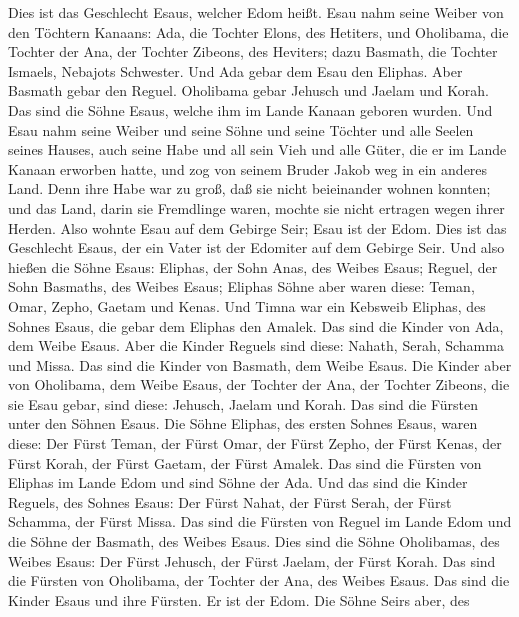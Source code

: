  Dies ist das Geschlecht Esaus, welcher Edom heißt.
 Esau nahm seine Weiber von den Töchtern Kanaans: Ada, die
Tochter Elons, des Hetiters, und Oholibama, die Tochter der Ana, der
Tochter Zibeons, des Heviters;  dazu Basmath, die Tochter
Ismaels, Nebajots Schwester.  Und Ada gebar dem Esau den
Eliphas. Aber Basmath gebar den Reguel.  Oholibama gebar
Jehusch und Jaelam und Korah. Das sind die Söhne Esaus, welche ihm im
Lande Kanaan geboren wurden.  Und Esau nahm seine Weiber
und seine Söhne und seine Töchter und alle Seelen seines Hauses, auch
seine Habe und all sein Vieh und alle Güter, die er im Lande Kanaan
erworben hatte, und zog von seinem Bruder Jakob weg in ein anderes Land.
 Denn ihre Habe war zu groß, daß sie nicht beieinander
wohnen konnten; und das Land, darin sie Fremdlinge waren, mochte sie
nicht ertragen wegen ihrer Herden.  Also wohnte Esau auf
dem Gebirge Seir; Esau ist der Edom.  Dies ist das
Geschlecht Esaus, der ein Vater ist der Edomiter auf dem Gebirge Seir.
 Und also hießen die Söhne Esaus: Eliphas, der Sohn Anas,
des Weibes Esaus; Reguel, der Sohn Basmaths, des Weibes Esaus;
 Eliphas Söhne aber waren diese: Teman, Omar, Zepho,
Gaetam und Kenas.  Und Timna war ein Kebsweib Eliphas,
des Sohnes Esaus, die gebar dem Eliphas den Amalek. Das sind die Kinder
von Ada, dem Weibe Esaus.  Aber die Kinder Reguels sind
diese: Nahath, Serah, Schamma und Missa. Das sind die Kinder von
Basmath, dem Weibe Esaus.  Die Kinder aber von Oholibama,
dem Weibe Esaus, der Tochter der Ana, der Tochter Zibeons, die sie Esau
gebar, sind diese: Jehusch, Jaelam und Korah.  Das sind
die Fürsten unter den Söhnen Esaus. Die Söhne Eliphas, des ersten Sohnes
Esaus, waren diese: Der Fürst Teman, der Fürst Omar, der Fürst Zepho,
der Fürst Kenas,  der Fürst Korah, der Fürst Gaetam, der
Fürst Amalek. Das sind die Fürsten von Eliphas im Lande Edom und sind
Söhne der Ada.  Und das sind die Kinder Reguels, des
Sohnes Esaus: Der Fürst Nahat, der Fürst Serah, der Fürst Schamma, der
Fürst Missa. Das sind die Fürsten von Reguel im Lande Edom und die Söhne
der Basmath, des Weibes Esaus.  Dies sind die Söhne
Oholibamas, des Weibes Esaus: Der Fürst Jehusch, der Fürst Jaelam, der
Fürst Korah. Das sind die Fürsten von Oholibama, der Tochter der Ana,
des Weibes Esaus.  Das sind die Kinder Esaus und ihre
Fürsten. Er ist der Edom.  Die Söhne Seirs aber, des
